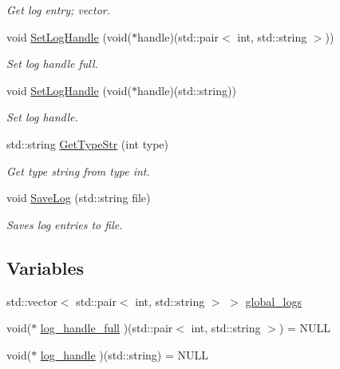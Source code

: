 \begin{DoxyCompactItemize}
\begin{DoxyCompactList}\small\item\em Get log entry; vector. \end{DoxyCompactList}\item 
void \hyperlink{namespacepessum_a587b50496dee1a27cbfe99025bc15656}{Set\+Log\+Handle} (void($\ast$handle)(std\+::pair$<$ int, std\+::string $>$))
\begin{DoxyCompactList}\small\item\em Set log handle full. \end{DoxyCompactList}\item 
void \hyperlink{namespacepessum_ab20026ac5dd6e6014097f8792679a2df}{Set\+Log\+Handle} (void($\ast$handle)(std\+::string))
\begin{DoxyCompactList}\small\item\em Set log handle. \end{DoxyCompactList}\item 
std\+::string \hyperlink{namespacepessum_a7a72cd1ada7b9736ebd7914ad5a9eedf}{Get\+Type\+Str} (int type)
\begin{DoxyCompactList}\small\item\em Get type string from type int. \end{DoxyCompactList}\item 
void \hyperlink{namespacepessum_a73443b520f83c0a1898a1e8566f03e91}{Save\+Log} (std\+::string file)
\begin{DoxyCompactList}\small\item\em Saves log entries to file. \end{DoxyCompactList}\end{DoxyCompactItemize}
\subsection*{Variables}
\begin{DoxyCompactItemize}
\item 
std\+::vector$<$ std\+::pair$<$ int, std\+::string $>$ $>$ \hyperlink{namespacepessum_af89cb9c0ecf053bd93b6cfadf606b350}{global\+\_\+logs}
\item 
void($\ast$ \hyperlink{namespacepessum_abf1b472e1b61a337c584d96eb9789f8e}{log\+\_\+handle\+\_\+full} )(std\+::pair$<$ int, std\+::string $>$) = N\+U\+LL
\item 
void($\ast$ \hyperlink{namespacepessum_af96bc8aacecc5a8145c0df704b5f9b54}{log\+\_\+handle} )(std\+::string) = N\+U\+LL
\end{DoxyCompactItemize}



